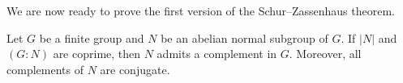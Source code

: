 

We are now ready to prove the first version of the
Schur--Zassenhaus theorem. 

\begin{theorem}
	\label{thm:SchurZassenhaus:abeliano}
	Let $G$ be a finite group and $N$ be an abelian normal subgroup of $G$. If 
 	$|N|$ and $(G:N)$ are coprime, then $N$ admits a complement in $G$. Moreover, 
    all complements of $N$ are conjugate. 
\end{theorem}

